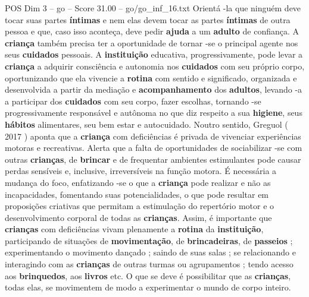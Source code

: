 \begin{textsample}{POS Dim 3 – go – Score 31.00 – go/go\_inf\_16.txt}
Orientá -la que ninguém deve tocar suas partes \textbf{íntimas} e nem elas devem tocar as partes \textbf{íntimas} de outra pessoa e que, caso isso aconteça, deve pedir \textbf{ajuda} a um \textbf{adulto} de confiança.
A \textbf{criança} também precisa ter a oportunidade de tornar -se o principal agente nos seus \textbf{cuidados} pessoais.
A \textbf{instituição} educativa, progressivamente, pode levar a \textbf{criança} a adquirir consciência e autonomia nos \textbf{cuidados} com seu próprio corpo, oportunizando que ela vivencie a \textbf{rotina} com sentido e significado, organizada e desenvolvida a partir da mediação e \textbf{acompanhamento} dos \textbf{adultos}, levando -a a participar dos \textbf{cuidados} com seu corpo, fazer escolhas, tornando -se progressivamente responsável e autônoma no que diz respeito a sua \textbf{higiene}, seus \textbf{hábitos} alimentares, seu bem estar e autocuidado.
Noutro sentido, Greguol ( 2017 ) aponta que a \textbf{criança} com deficiências é privada de vivenciar experiências motoras e recreativas.
Alerta que a falta de oportunidades de sociabilizar -se com outras \textbf{crianças}, de \textbf{brincar} e de frequentar ambientes estimulantes pode causar perdas sensíveis e, inclusive, irreversíveis na função motora.
É necessária a mudança do foco, enfatizando -se o que a \textbf{criança} pode realizar e não as incapacidades, fomentando suas potencialidades, o que pode resultar em proposições criativas que permitam a estimulação do repertório motor e o desenvolvimento corporal de todas as \textbf{crianças}.
Assim, é importante que \textbf{crianças} com deficiências vivam plenamente a \textbf{rotina} da \textbf{instituição}, participando de situações de \textbf{movimentação}, de \textbf{brincadeiras}, de \textbf{passeios} ; experimentando o movimento dançado ; saindo de suas salas ; se relacionando e interagindo com as \textbf{crianças} de outras turmas ou agrupamentos ; tendo acesso aos \textbf{brinquedos}, aos \textbf{livros} etc.
O que se deve é possibilitar que as \textbf{crianças}, todas elas, se movimentem de modo a experimentar o mundo de corpo inteiro.

\end{textsample}
